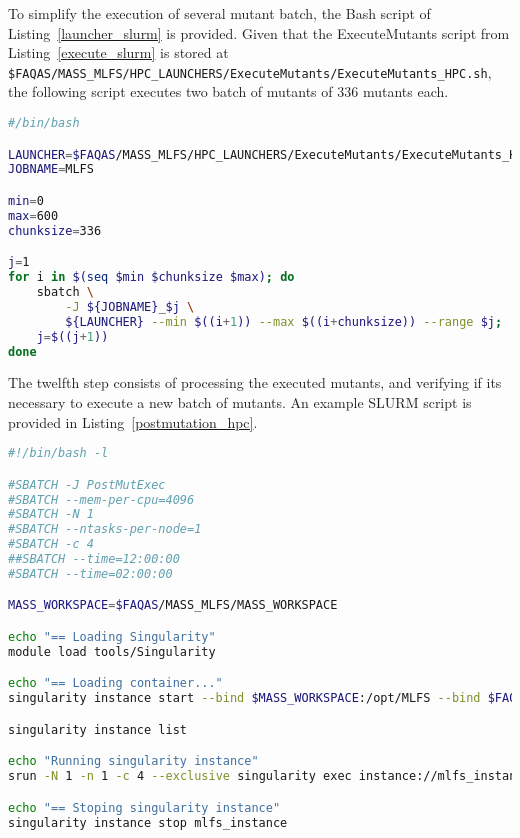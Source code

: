 To simplify the execution of several mutant batch, the Bash script of Listing~\ref{launcher_slurm} is provided.
Given that the ExecuteMutants script from Listing~\ref{execute_slurm} is stored at \\\texttt{\$FAQAS/MASS\_MLFS/HPC\_LAUNCHERS/ExecuteMutants/ExecuteMutants\_HPC.sh}, the following script executes two batch of mutants of 336 mutants each.

\begin{lstlisting}[language=bash, label=launcher_slurm ,caption=Example of a Bash launcher for the ExecuteMutants\_HPC.sh script.]
#/bin/bash

LAUNCHER=$FAQAS/MASS_MLFS/HPC_LAUNCHERS/ExecuteMutants/ExecuteMutants_HPC.sh
JOBNAME=MLFS

min=0
max=600
chunksize=336

j=1
for i in $(seq $min $chunksize $max); do
    sbatch \
        -J ${JOBNAME}_$j \
        ${LAUNCHER} --min $((i+1)) --max $((i+chunksize)) --range $j;
    j=$((j+1)) 
done
\end{lstlisting}

The twelfth step consists of processing the executed mutants, and verifying if its necessary to execute a new batch of mutants. An example SLURM script is provided in Listing~\ref{postmutation_hpc}.

\begin{lstlisting}[language=bash, label=postmutation_hpc ,caption=Example of a SLURM launcher for the PostMutation step.]
#!/bin/bash -l

#SBATCH -J PostMutExec
#SBATCH --mem-per-cpu=4096
#SBATCH -N 1
#SBATCH --ntasks-per-node=1
#SBATCH -c 4
##SBATCH --time=12:00:00
#SBATCH --time=02:00:00

MASS_WORKSPACE=$FAQAS/MASS_MLFS/MASS_WORKSPACE

echo "== Loading Singularity"
module load tools/Singularity

echo "== Loading container..."
singularity instance start --bind $MASS_WORKSPACE:/opt/MLFS --bind $FAQAS/srcirorfaqas:/opt/srcirorfaqas $FAQAS/MASS_MLFS/blts.sif mlfs_instance

singularity instance list

echo "Running singularity instance"
srun -N 1 -n 1 -c 4 --exclusive singularity exec instance://mlfs_instance /bin/bash /opt/MLFS/PostMutation_HPC.sh 1 672

echo "== Stoping singularity instance"
singularity instance stop mlfs_instance
\end{lstlisting}

